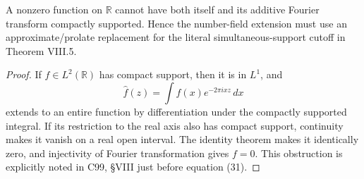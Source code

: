 \begin{proposition}
\label{AC-T10}
A nonzero function on \(\mathbb R\) cannot have
both itself and its additive Fourier transform
compactly supported. Hence the number-field
extension must use an approximate/prolate
replacement for the literal simultaneous-support
cutoff in Theorem VIII.5.
\end{proposition}

\begin{proof}
If \(f\in L^2(\mathbb R)\) has compact support,
then it is in \(L^1\), and
\[
 \widehat f(z)=\int f(x)e^{-2\pi i xz}\,dx
\]
extends to an entire function by differentiation
under the compactly supported integral.
If its restriction to the real axis also has
compact support, continuity makes it vanish
on a real open interval. The identity theorem
makes it identically zero, and injectivity
of Fourier transformation gives \(f=0\).
This obstruction is explicitly noted in
C99, \S VIII just before equation (31).
\end{proof}

